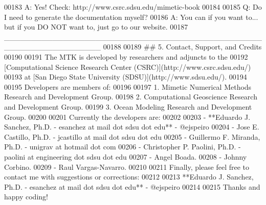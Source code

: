 \begin{DoxyCode}
00183 A: Yes! Check: http:\textcolor{comment}{//www.csrc.sdsu.edu/mimetic-book}
00184 
00185 Q: Do I need to generate the documentation myself?
00186 A: You can if you want to... but if you DO NOT want to, just go to our website.
00187     \_\_\_\_\_\_\_\_\_\_\_\_\_\_\_\_\_\_\_\_\_\_\_\_\_\_\_\_\_\_\_\_\_\_\_\_\_\_\_\_\_\_\_\_\_\_\_\_\_\_\_\_\_\_\_\_\_\_\_\_\_\_\_\_\_\_
00188 
00189 ## 5. Contact, Support, and Credits
00190 
00191 The MTK is developed by researchers and adjuncts to the
00192 [Computational Science Research Center (CSRC)](http:\textcolor{comment}{//www.csrc.sdsu.edu/)}
00193 at [San Diego State University (SDSU)](http:\textcolor{comment}{//www.sdsu.edu/).}
00194 
00195 Developers are members of:
00196 
00197 1. Mimetic Numerical Methods Research and Development Group.
00198 2. Computational Geoscience Research and Development Group.
00199 3. Ocean Modeling Research and Development Group.
00200 
00201 Currently the developers are:
00202 
00203 - **Eduardo J. Sanchez, Ph.D. - esanchez at mail dot sdsu dot edu** - @ejspeiro
00204 - Jose E. Castillo, Ph.D. - jcastillo at mail dot sdsu dot edu
00205 - Guillermo F. Miranda, Ph.D. - unigrav at hotmail dot com
00206 - Christopher P. Paolini, Ph.D. - paolini at engineering dot sdsu dot edu
00207 - Angel Boada.
00208 - Johnny Corbino.
00209 - Raul Vargas-Navarro.
00210 
00211 Finally, please feel free to contact me with suggestions or corrections:
00212 
00213 **Eduardo J. Sanchez, Ph.D. - esanchez at mail dot sdsu dot edu** - @ejspeiro
00214 
00215 Thanks and happy coding!
\end{DoxyCode}
